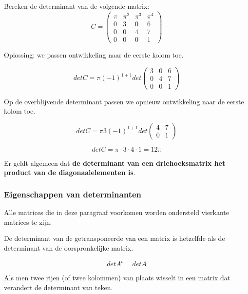 \begin{voorbeeld}
	Bereken de determinant van de volgende matrix:
	 \[ C=\left( \begin{matrix}
	\pi & \pi^2 & \pi^3 & \pi^4 \\
	0   &  3    &   0   &   6   \\
	0   &  0    &   4   &   7   \\
	0   &  0    &   0   &   1  
	\end{matrix} \right)
	\]
	
	Oplossing: we passen ontwikkeling naar de eerste kolom toe.
	
	\[ det C= \pi (-1)^{1+1} det \left( \begin{matrix}
		3    &   0   &   6   \\
		0    &   4   &   7   \\
		0    &   0   &   1  
	\end{matrix} \right) \]
	
	Op de overblijvende determinant passen we opnieuw ontwikkeling naar de eerste kolom toe.
	
	\[ det C= \pi 3 (-1)^{1+1} det \left( \begin{matrix}
	4 & 7 \\ 0 & 1 
	\end{matrix} \right) \]
	
	\[ det C = \pi\cdot 3\cdot 4\cdot 1 = 12\pi \]
	
	Er geldt algemeen dat {\bf de determinant van een driehoeksmatrix het product van de diagonaalelementen is}. 
\end{voorbeeld}		


\subsubsection{Eigenschappen van determinanten}

Alle matrices die in deze paragraaf voorkomen worden ondersteld vierkante matrices te zijn. 


\begin{eigenschap}
		De determinant van de getransponeerde van een matrix is hetzelfde als de determinant van de oorspronkelijke matrix.
	
	\[ det A^{t}=det A \]
	\end{eigenschap}
	
\begin{eigenschap}
		Als men twee rijen (of twee kolommen) van plaats wisselt in een matrix dat verandert de determinant van teken. 
	\end{eigenschap}
	
